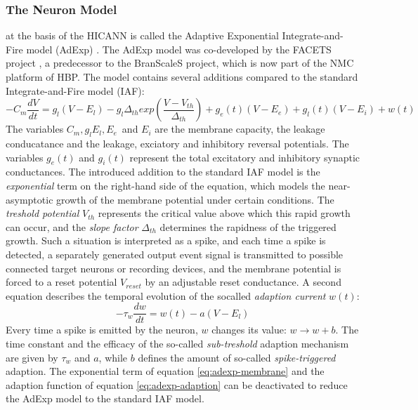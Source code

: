 \subsubsection{The Neuron Model}\label{sect:adexp} at the basis of the HICANN is called the Adaptive Exponential Integrate-and-Fire model (AdExp) \cite{brette_adaptive_2005}.
The AdExp model was co-developed by the FACETS project \cite{schemmel_wafer-scale_2010}, a predecessor to the BranScaleS project, which is now part of the NMC platform of HBP.
The model contains several additions compared to the standard Integrate-and-Fire model (IAF):
\begin{equation}\label{eq:adexp-membrane}
-C_m\frac{dV}{dt} = g_l(V-E_l) - g_l\Delta_{th}exp(\frac{V-V_{th}}{\Delta_{th}}) + g_e(t)(V-E_e)+g_l(t)(V-E_i)+w(t)
\end{equation}
The variables $C_m, g_l E_l, E_e$ and $E_i$ are the membrane capacity, the leakage conducatance and the leakage, exciatory and inhibitory reversal potentials.
The variables $g_e(t)$ and $g_i(t)$ represent the total excitatory and inhibitory synaptic conductances.
The introduced addition to the standard IAF model is the \textit{exponential} term on the right-hand side of the equation, which models the near-asymptotic growth of the membrane potential under certain conditions.
The \textit{treshold potential} $V_{th}$ represents the critical value above which this rapid growth can occur, and the \textit{slope factor} $\Delta_{th}$ determines the rapidness of the triggered growth.
Such a situation is interpreted as a spike, and each time a spike is detected, a separately generated output event signal is transmitted to possible connected target neurons or recording devices, and the membrane potential is forced to a reset potential $V_{reset}$ by an adjustable reset conductance.
A second equation describes the temporal evolution of the socalled \textit{adaption current} $w(t)$:
\begin{equation}\label{eq:adexp-adaption}
-\tau_{w}\frac{dw}{dt} = w(t) - a(V-E_l)
\end{equation}
Every time a spike is emitted by the neuron, $w$ changes its value: $w \rightarrow w + b$.
The time constant and the efficacy of the so-called \textit{sub-treshold} adaption mechanism are given by $\tau_w$ and $a$, while $b$ defines the amount of so-called \textit{spike-triggered} adaption.
The exponential term of equation \ref{eq:adexp-membrane} and the adaption function of equation \ref{eq:adexp-adaption} can be deactivated to reduce the AdExp model to the standard IAF model.
\cite{schemmel_wafer-scale_2010}\cite{brette_adaptive_2005}

